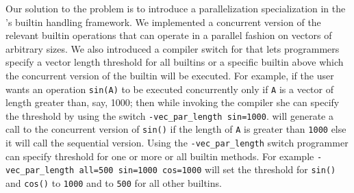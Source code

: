 Our solution to the problem is to introduce a parallelization
specialization in the \mixten's builtin handling framework. We
implemented a concurrent version of the relevant builtin operations that
can operate in a parallel fashion on vectors of arbitrary sizes. We also
introduced a compiler switch for \mixten that lets programmers specify a
vector length threshold for all builtins or a specific builtin above
which the concurrent version of the builtin will be executed. For
example, if the user wants an operation \verb|sin(A)| to be executed
concurrently only if \verb|A| is a vector of length greater than, say,
1000; then while invoking the \mixten compiler she can specify the
threshold by using the switch \verb|-vec_par_length sin=1000|. \mixten
will generate a call to the concurrent version of \verb|sin()| if the
length of \verb|A| is greater than \verb|1000| else it will call the
sequential version. Using the \verb|-vec_par_length| switch programmer
can specify threshold for one or more or all builtin methods. For
example \verb|-vec_par_length all=500 sin=1000 cos=1000| will set the
threshold for \verb|sin()| and \verb|cos()| to \verb|1000| and to
\verb|500| for all other builtins.



